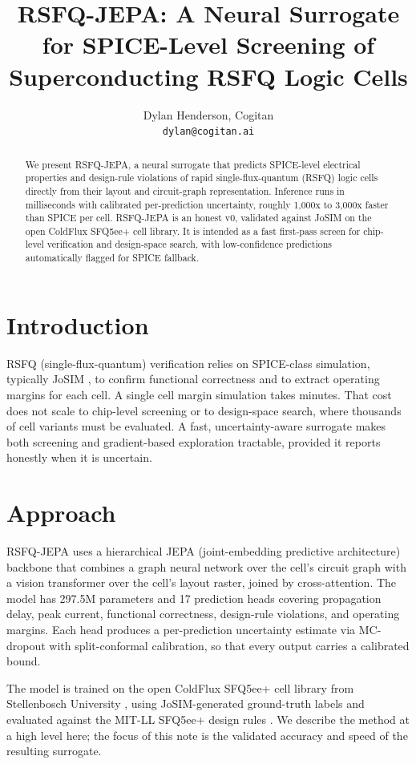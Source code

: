 \documentclass[11pt]{article}
\title{RSFQ-JEPA: A Neural Surrogate for SPICE-Level Screening of Superconducting RSFQ Logic Cells}
\author{Dylan Henderson, Cogitan \\ \texttt{dylan@cogitan.ai}}
\date{}
\begin{document}
\maketitle

\begin{abstract}
We present RSFQ-JEPA, a neural surrogate that predicts SPICE-level electrical properties and design-rule violations of rapid single-flux-quantum (RSFQ) logic cells directly from their layout and circuit-graph representation. Inference runs in milliseconds with calibrated per-prediction uncertainty, roughly 1,000x to 3,000x faster than SPICE per cell. RSFQ-JEPA is an honest v0, validated against JoSIM on the open ColdFlux SFQ5ee+ cell library. It is intended as a fast first-pass screen for chip-level verification and design-space search, with low-confidence predictions automatically flagged for SPICE fallback.
\end{abstract}

\section{Introduction}
RSFQ (single-flux-quantum) verification relies on SPICE-class simulation, typically JoSIM \cite{josim}, to confirm functional correctness and to extract operating margins for each cell. A single cell margin simulation takes minutes. That cost does not scale to chip-level screening or to design-space search, where thousands of cell variants must be evaluated. A fast, uncertainty-aware surrogate makes both screening and gradient-based exploration tractable, provided it reports honestly when it is uncertain.

\section{Approach}
RSFQ-JEPA uses a hierarchical JEPA (joint-embedding predictive architecture) \cite{jepa} backbone that combines a graph neural network over the cell's circuit graph with a vision transformer over the cell's layout raster, joined by cross-attention. The model has 297.5M parameters and 17 prediction heads covering propagation delay, peak current, functional correctness, design-rule violations, and operating margins. Each head produces a per-prediction uncertainty estimate via MC-dropout with split-conformal calibration, so that every output carries a calibrated bound.

The model is trained on the open ColdFlux SFQ5ee+ cell library from Stellenbosch University \cite{coldflux}, using JoSIM-generated ground-truth labels and evaluated against the MIT-LL SFQ5ee+ design rules \cite{mitll}. We describe the method at a high level here; the focus of this note is the validated accuracy and speed of the resulting surrogate.
\end{document}
